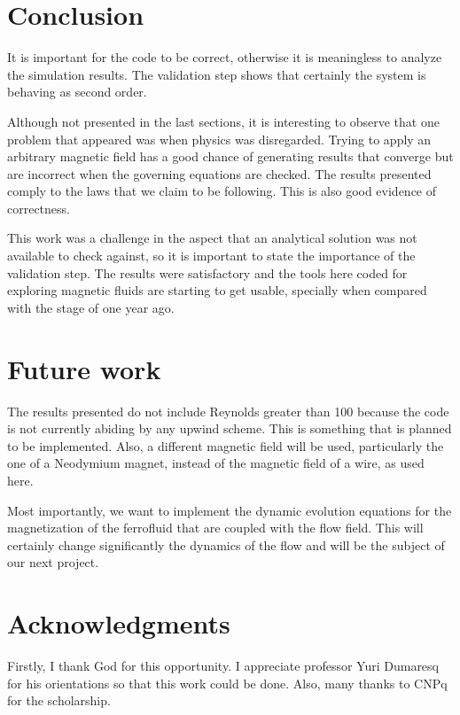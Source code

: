 \documentclass[journal]{IEEEtran}
\begin{document}
\section{Conclusion}

It is important for the code to be correct, otherwise it is meaningless to analyze the simulation results. The validation step shows that certainly the system is behaving as second order. 

Although not presented in the last sections, it is interesting to observe that one problem that appeared was when physics was disregarded. Trying to apply an arbitrary magnetic field has a good chance of generating results that converge but are incorrect when the governing equations are checked. The results presented comply to the laws that we claim to be following. This is also good evidence of correctness.

This work was a challenge in the aspect that an analytical solution was not available to check against, so it is important to state the importance of the validation step. The results were satisfactory and the tools here coded for exploring magnetic fluids are starting to get usable, specially when compared with the stage of one year ago.


\section{Future work}
The results presented do not include Reynolds greater than 100 because the code is not currently abiding by any upwind scheme. This is something that is planned to be implemented. Also, a different magnetic field will be used, particularly the one of a Neodymium magnet\cite{McCaigClegg}, instead of the magnetic field of a wire\cite{Tzirtzilakis2013}, as used here.

Most importantly, we want to implement the dynamic evolution equations for the magnetization of the ferrofluid that are coupled with the flow field. This will certainly change significantly the dynamics of the flow and will be the subject of our next project.




\section*{Acknowledgments}

Firstly, I thank God for this opportunity. I appreciate professor Yuri Dumaresq for his orientations so that this work could be done. Also, many thanks to CNPq for the scholarship.




\end{document}
